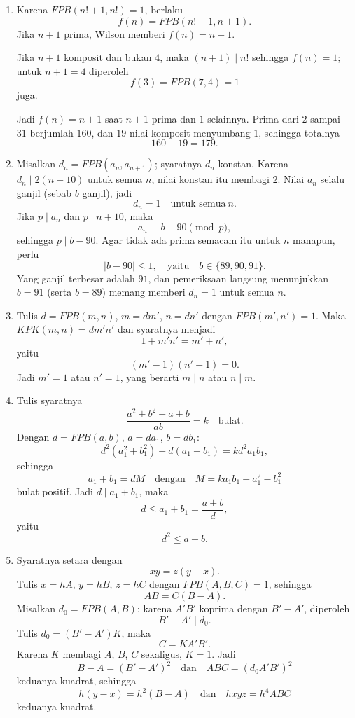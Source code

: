 \documentclass[12pt]{scrartcl}
\begin{document}
\begin{enumerate}[resume]
	\item Karena $FPB(n! + 1, n!) = 1$, berlaku
	\[ f(n) = FPB(n! + 1, n + 1). \]
	Jika $n + 1$ prima, Wilson memberi $f(n) = n + 1$.

	Jika $n + 1$ komposit dan bukan $4$, maka $(n+1) \mid n!$ sehingga $f(n) = 1$;
	untuk $n + 1 = 4$ diperoleh
	\[ f(3) = FPB(7, 4) = 1 \]
	juga.

	Jadi $f(n) = n + 1$ saat $n + 1$ prima dan $1$ selainnya.
	Prima dari $2$ sampai $31$ berjumlah $160$,
	dan $19$ nilai komposit menyumbang $1$, sehingga totalnya
	\[ 160 + 19 = 179. \]

	\item Misalkan $d_n = FPB(a_n, a_{n+1})$; syaratnya $d_n$ konstan.
	Karena $d_n \mid 2(n+10)$ untuk semua $n$, nilai konstan itu membagi $2$.
	Nilai $a_n$ selalu ganjil (sebab $b$ ganjil), jadi
	\[ d_n = 1 \quad \text{untuk semua} \ n. \]
	Jika $p \mid a_n$ dan $p \mid n + 10$, maka
	\[ a_n \equiv b - 90 \pmod{p}, \]
	sehingga $p \mid b - 90$.
	Agar tidak ada prima semacam itu untuk $n$ manapun, perlu
	\[ |b - 90| \le 1, \quad \text{yaitu} \quad b \in \{89, 90, 91\}. \]
	Yang ganjil terbesar adalah $91$, dan pemeriksaan langsung menunjukkan $b = 91$
	(serta $b = 89$) memang memberi $d_n = 1$ untuk semua $n$.

	\item Tulis $d = FPB(m, n)$, $m = dm'$, $n = dn'$ dengan $FPB(m', n') = 1$.
	Maka $KPK(m, n) = dm'n'$ dan syaratnya menjadi
	\[ 1 + m'n' = m' + n', \]
	yaitu
	\[ (m' - 1)(n' - 1) = 0. \]
	Jadi $m' = 1$ atau $n' = 1$, yang berarti $m \mid n$ atau $n \mid m$.

	\item Tulis syaratnya
	\[ \frac{a^2 + b^2 + a + b}{ab} = k \quad \text{bulat}. \]
	Dengan $d = FPB(a, b)$, $a = da_1$, $b = db_1$:
	\[ d^2(a_1^2 + b_1^2) + d(a_1 + b_1) = kd^2a_1b_1, \]
	sehingga
	\[ a_1 + b_1 = dM \quad \text{dengan} \quad M = ka_1b_1 - a_1^2 - b_1^2 \]
	bulat positif.
	Jadi $d \mid a_1 + b_1$, maka
	\[ d \le a_1 + b_1 = \frac{a+b}{d}, \]
	yaitu
	\[ d^2 \le a + b. \]

	\item Syaratnya setara dengan
	\[ xy = z(y - x). \]
	Tulis $x = hA$, $y = hB$, $z = hC$ dengan $FPB(A, B, C) = 1$,
	sehingga
	\[ AB = C(B - A). \]
	Misalkan $d_0 = FPB(A, B)$; karena $A'B'$ koprima dengan $B' - A'$,
	diperoleh
	\[ B' - A' \mid d_0. \]
	Tulis $d_0 = (B' - A')K$, maka
	\[ C = KA'B'. \]
	Karena $K$ membagi $A$, $B$, $C$ sekaligus, $K = 1$.
	Jadi
	\[ B - A = (B' - A')^2 \quad \text{dan} \quad ABC = (d_0A'B')^2 \]
	keduanya kuadrat, sehingga
	\[ h(y - x) = h^2(B - A) \quad \text{dan} \quad hxyz = h^4ABC \]
	keduanya kuadrat.


\end{enumerate}
\end{document}
